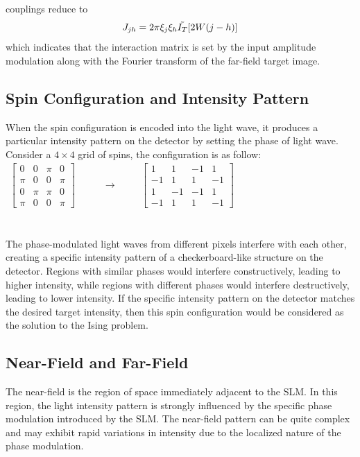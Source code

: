\fi

couplings reduce to 
\begin{equation}
 J_{jh} = 2 \pi  \xi_j \xi_h  \Tilde{I_T} [2W(j-h)]   
\end{equation}
which indicates that the interaction matrix is set by the input amplitude modulation along with the Fourier transform of the far-field target image. \\

\subsection{Spin Configuration and Intensity Pattern}
When the spin configuration is encoded into the light wave, it produces a particular intensity pattern on the detector by setting the phase of light wave. Consider a $4\times4$ grid of spins, the configuration is as follow:\\

$\begin{aligned}
\begin{bmatrix}
0 & 0 & \pi & 0 \\
\pi & 0 & 0 & \pi \\
0 & \pi & \pi & 0 \\
\pi & 0 & 0 & \pi
\end{bmatrix}
\end{aligned}
\hspace{1cm}
\rightarrow
\hspace{1cm}
\begin{bmatrix}
1 & 1 & -1 & 1 \\
-1 & 1 & 1 & -1 \\
1 & -1 & -1 & 1 \\
-1 & 1 & 1 & -1
\end{bmatrix}$
\\
\\
\\
The phase-modulated light waves from different pixels interfere with each other, creating a specific intensity pattern of a checkerboard-like structure on the detector. Regions with similar phases would interfere constructively, leading to higher intensity, while regions with different phases would interfere destructively, leading to lower intensity. If the  specific intensity pattern on the detector matches the desired target intensity, then this spin configuration would be considered as the solution to the Ising problem.\\

\subsection{Near-Field and Far-Field}
The near-field is the region of space immediately adjacent to the SLM. In this region, the light intensity pattern is strongly influenced by the specific phase modulation introduced by the SLM. The near-field pattern can be quite complex and may exhibit rapid variations in intensity due to the localized nature of the phase modulation. \\

